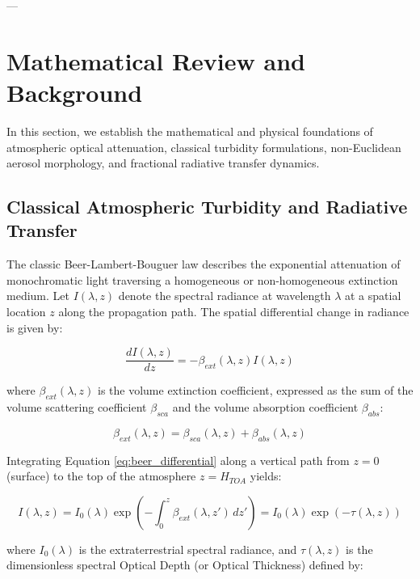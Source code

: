 \documentclass[12pt,a4paper]{article}
\begin{document}
---

\section{Mathematical Review and Background}

In this section, we establish the mathematical and physical foundations of atmospheric optical attenuation, classical turbidity formulations, non-Euclidean aerosol morphology, and fractional radiative transfer dynamics.

\subsection{Classical Atmospheric Turbidity and Radiative Transfer}

The classic Beer-Lambert-Bouguer law describes the exponential attenuation of monochromatic light traversing a homogeneous or non-homogeneous extinction medium. Let $I(\lambda, z)$ denote the spectral radiance at wavelength $\lambda$ at a spatial location $z$ along the propagation path. The spatial differential change in radiance is given by:

\begin{equation}
\frac{d I(\lambda, z)}{dz} = -\beta_{ext}(\lambda, z) I(\lambda, z)
\label{eq:beer_differential}
\end{equation}

where $\beta_{ext}(\lambda, z)$ is the volume extinction coefficient, expressed as the sum of the volume scattering coefficient $\beta_{sca}$ and the volume absorption coefficient $\beta_{abs}$:

\begin{equation}
\beta_{ext}(\lambda, z) = \beta_{sca}(\lambda, z) + \beta_{abs}(\lambda, z)
\end{equation}

Integrating Equation \ref{eq:beer_differential} along a vertical path from $z = 0$ (surface) to the top of the atmosphere $z = H_{TOA}$ yields:

\begin{equation}
I(\lambda, z) = I_0(\lambda) \exp\left( -\int_{0}^{z} \beta_{ext}(\lambda, z') \, dz' \right) = I_0(\lambda) \exp\left( -\tau(\lambda, z) \right)
\label{eq:beer_integrated}
\end{equation}

where $I_0(\lambda)$ is the extraterrestrial spectral radiance, and $\tau(\lambda, z)$ is the dimensionless spectral Optical Depth (or Optical Thickness) defined by:
\end{document}
